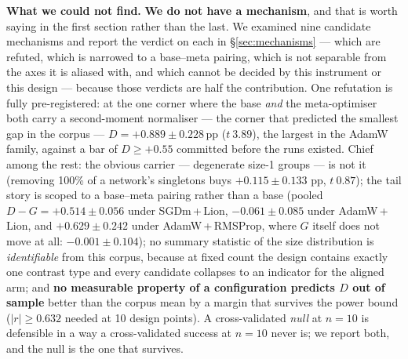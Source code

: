 \documentclass[10pt,letterpaper]{article}
\newcommand{\pp}{\,\text{pp}}                  %
\newcommand{\Dstat}{D}                         %
\newcommand{\Gstat}{G}                         %
\begin{document}
\textbf{What we could not find.} \textbf{We do not have a mechanism}, and that is worth saying
in the first section rather than the last. We examined nine candidate mechanisms and report the
verdict on each in \S\ref{sec:mechanisms} --- which are refuted, which is narrowed to a
base--meta pairing, which is not separable from the axes it is aliased with, and which cannot be
decided by this instrument or this design --- because those verdicts are half the contribution.
One refutation is fully pre-registered: at the one corner where the base \emph{and} the
meta-optimiser both carry a second-moment normaliser --- the corner that predicted the smallest
gap in the corpus --- $\Dstat = \mathbf{+0.889 \pm 0.228}\pp$ ($t\ 3.89$), the largest in the
AdamW family, against a bar of $\Dstat \ge +0.55$ committed before the runs existed. Chief among
the rest: the obvious
carrier --- degenerate size-1 groups --- is not it (removing 100\% of a network's singletons
buys $+0.115 \pm 0.133$ pp, $t\ 0.87$); the tail story is scoped to a base--meta pairing rather
than a base (pooled $\Dstat - \Gstat = +0.514 \pm 0.056$ under SGDm\,+\,Lion,
$-0.061 \pm 0.085$ under AdamW\,+\,Lion, and $+0.629 \pm 0.242$ under AdamW\,+\,RMSProp, where
$\Gstat$ itself does not move at all: $-0.001 \pm 0.104$); no summary
statistic of the size distribution is \emph{identifiable} from this corpus, because at fixed
count the design contains exactly one contrast type and every candidate collapses to an
indicator for the aligned arm; and \textbf{no measurable property of a configuration predicts
$\Dstat$ out of sample} better than the corpus mean by a margin that survives the power bound
($|r| \ge 0.632$ needed at 10 design points). A cross-validated \emph{null} at $n = 10$ is
defensible in a way a cross-validated success at $n = 10$ never is; we report both, and the null
is the one that survives.
\end{document}
